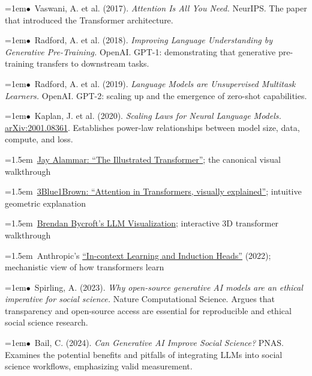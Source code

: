\documentclass[11pt, a4paper]{article}
\newcommand{\seclabel}[1]{%
  \vspace{0.6em}{\normalsize\sffamily\bfseries\textcolor{accent}{#1}}\par\vspace{0.2em}
}
\newcommand{\refpaper}[1]{%
  \par\hangindent=1em\hangafter=1\noindent\textcolor{accent}{\small$\bullet$}~{\small #1}\par
}
\newcommand{\resource}[1]{%
  \par\hangindent=1.5em\hangafter=1\noindent\hspace{0.5em}{\small\textcolor{accent}{\guilsinglright}}~{\small #1}\par
}
\begin{document}
\seclabel{Core Readings}

\refpaper{Vaswani, A. et al. (2017). \textit{Attention Is All You Need.} NeurIPS. The paper that introduced the Transformer architecture.}

\refpaper{Radford, A. et al. (2018). \textit{Improving Language Understanding by Generative Pre-Training.} OpenAI. GPT-1: demonstrating that generative pre-training transfers to downstream tasks.}

\refpaper{Radford, A. et al. (2019). \textit{Language Models are Unsupervised Multitask Learners.} OpenAI. GPT-2: scaling up and the emergence of zero-shot capabilities.}

\refpaper{Kaplan, J. et al. (2020). \textit{Scaling Laws for Neural Language Models.} \href{https://arxiv.org/abs/2001.08361}{arXiv:2001.08361}. Establishes power-law relationships between model size, data, compute, and loss.}

\seclabel{Further Resources}

\resource{\href{https://jalammar.github.io/illustrated-transformer/}{Jay Alammar: ``The Illustrated Transformer''}; the canonical visual walkthrough}

\resource{\href{https://www.youtube.com/watch?v=eMlx5fFNoYc}{3Blue1Brown: ``Attention in Transformers, visually explained''}; intuitive geometric explanation}

\resource{\href{https://bbycroft.net/llm}{Brendan Bycroft's LLM Visualization}; interactive 3D transformer walkthrough}

\resource{Anthropic's \href{https://transformer-circuits.pub/2022/in-context-learning-and-induction-heads/index.html}{``In-context Learning and Induction Heads''} (2022); mechanistic view of how transformers learn}

\seclabel{Social Science Applications}

\refpaper{Spirling, A. (2023). \textit{Why open-source generative AI models are an ethical imperative for social science.} Nature Computational Science. Argues that transparency and open-source access are essential for reproducible and ethical social science research.}

\refpaper{Bail, C. (2024). \textit{Can Generative AI Improve Social Science?} PNAS. Examines the potential benefits and pitfalls of integrating LLMs into social science workflows, emphasizing valid measurement.}


\newpage
\end{document}
